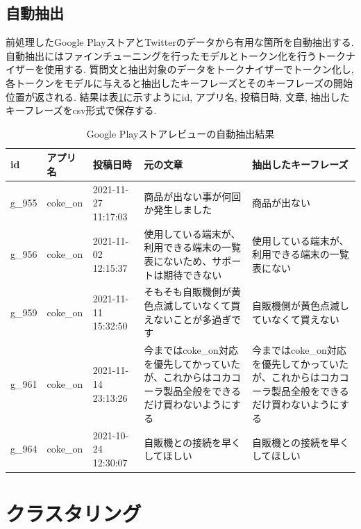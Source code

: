 \subsection{自動抽出}
前処理したGoogle PlayストアとTwitterのデータから有用な箇所を自動抽出する. 自動抽出にはファインチューニングを行ったモデルとトークン化を行うトークナイザーを使用する. 質問文と抽出対象のデータをトークナイザーでトークン化し, 各トークンをモデルに与えると抽出したキーフレーズとそのキーフレーズの開始位置が返される. 
結果は表\ref{tb:googleqa}に示すようにid, アプリ名, 投稿日時, 文章, 抽出したキーフレーズをcsv形式で保存する. 

\begin{table}[H]
  \caption{Google Playストアレビューの自動抽出結果}
  \label{tb:googleqa}
  \small
  \begin{center}
  \begin{tabularx}{\linewidth}{l|l|X|X|X}
    \hline
    id&アプリ名&投稿日時&元の文章&抽出したキーフレーズ\\\hline\hline
    g\_955&coke\_on&2021-11-27 11:17:03&商品が出ない事が何回か発生しました&商品が出ない\\\hline
    g\_956&coke\_on&2021-11-02 12:15:37&使用している端末が、利用できる端末の一覧表にないため、サポートは期待できない&使用している端末が、利用できる端末の一覧表にない\\\hline
    g\_959&coke\_on&2021-11-11 15:32:50&そもそも自販機側が黄色点滅していなくて買えないことが多過ぎです&自販機側が黄色点滅していなくて買えない\\\hline
    g\_961&coke\_on&2021-11-14 23:13:26&今まではcoke\_on対応を優先してかっていたが、これからはコカコーラ製品全般をできるだけ買わないようにする&今まではcoke\_on対応を優先してかっていたが、これからはコカコーラ製品全般をできるだけ買わないようにする\\\hline
    g\_964&coke\_on&2021-10-24 12:30:07&自販機との接続を早くしてほしい&自販機との接続を早くしてほしい\\\hline
  \end{tabularx}\end{center}
\end{table}


\section{クラスタリング}\label{clustering}
